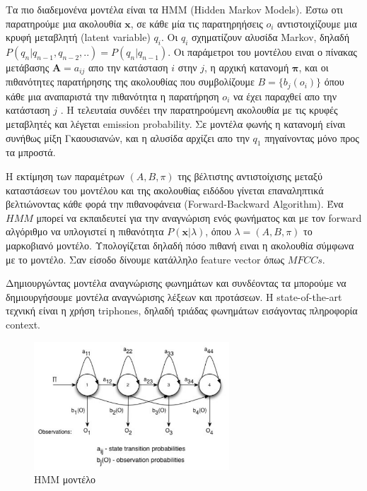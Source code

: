 \documentclass[12pt]{article}
\begin{document}
Τα πιο διαδεμονένα μοντέλα είναι τα HMM (Hidden Markov Models). Έστω οτι παρατηρούμε  μια ακολουθία $\textbf{x}$, σε κάθε μία τις παρατηρηήσεις $o_i$ αντιστοιχίζουμε μια κρυφή μεταβλητή (latent variable) $q_i$. Οι $q_i$ σχηματίζουν αλυσίδα Markov, δηλαδή  $P(q_n|q_{n-1},q_{n-2},..) = P(q_n|q_{n-1})$. Οι παράμετροι του μοντέλου ειναι ο πίνακας μετάβασης $\textbf{A}= a_{ij}$ απο την κατάσταση $i$ στην $j$, η αρχική κατανομή $\textbf{π}$, και οι πιθανότητες παρατήρησης της ακολουθίας που συμβολίζουμε $B = \{b_j(o_i)\}$ όπου κάθε μια αναπαριστά την πιθανότητα η παρατήρηση $o_i$ να έχει παραχθεί απο την κατάσταση $j$ . Η τελευταία συνδέει την παρατηρούμενη ακολουθία με τις κρυφές μεταβλητές και λέγεται emission probability.  Σε μοντέλα φωνής η κατανομή είναι συνήθως μίξη Γκαουσιανών, και η αλυσίδα αρχίζει απο την $q_1$ πηγαίνοντας μόνο προς τα μπροστά. 

Η εκτίμηση των παραμέτρων $(A,B,π) $ της βέλτιστης αντιστοίχισης μεταξύ καταστάσεων του μοντέλου και της ακολουθίας ειδόδου γίνεται επαναληπτικά βελτιώνοντας κάθε φορά την πιθανοφάνεια (Forward-Backward Algorithm). Ένα $HMM$ μπορεί να εκπαιδευτεί για την αναγνώριση ενός φωνήματος και με τον forward αλγόριθμο να υπλογιστεί η πιθανότητα $P(\textbf{x}|λ)$,  όπου $λ = (A,B,π)$ το μαρκοβιανό μοντέλο. Υπολογίζεται δηλαδή πόσο πιθανή ειναι η ακολουθία σύμφωνα με το μοντέλο. Σαν είσοδο δίνουμε κατάλληλο feature vector όπως $MFCCs$.

Δημιουργώντας μοντέλα αναγνώρισης φωνημάτων και συνδέοντας τα μπορούμε να δημιουργήσουμε μοντέλα αναγνώρισης λέξεων και προτάσεων. Η state-of-the-art τεχνική είναι η χρήση triphones, δηλαδή τριάδας φωνημάτων εισάγοντας πληροφορία context.


\begin{figure}[h!]
\caption{HMM μοντέλο}
\centering
\includegraphics[width=0.65\textwidth]{hmm1.png}
\end{figure}

\pagebreak
\end{document}
